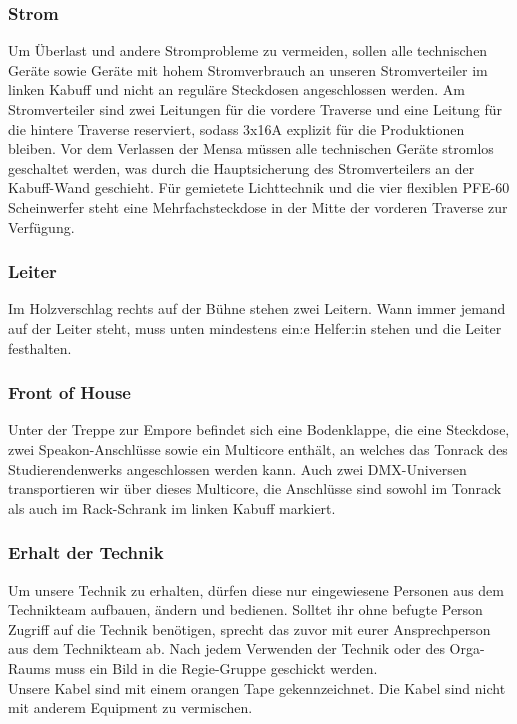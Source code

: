 \subsubsection{Strom}
Um Überlast und andere Stromprobleme zu vermeiden, sollen alle technischen Geräte sowie Geräte mit hohem Stromverbrauch an unseren Stromverteiler im linken Kabuff und nicht an reguläre Steckdosen angeschlossen werden. Am Stromverteiler sind zwei Leitungen für die vordere Traverse und eine Leitung für die hintere Traverse reserviert, sodass 3x16A explizit für die Produktionen bleiben.
Vor dem Verlassen der Mensa müssen alle technischen Geräte stromlos geschaltet werden, was durch die Hauptsicherung des Stromverteilers an der Kabuff-Wand geschieht.
Für gemietete Lichttechnik und die vier flexiblen PFE-60 Scheinwerfer steht eine Mehrfachsteckdose in der Mitte der vorderen Traverse zur Verfügung.

\subsubsection{Leiter}
Im Holzverschlag rechts auf der Bühne stehen zwei Leitern. Wann immer jemand auf der Leiter steht, muss unten mindestens ein:e Helfer:in stehen und die Leiter festhalten.

\subsubsection{Front of House}
Unter der Treppe zur Empore befindet sich eine Bodenklappe, die eine Steckdose, zwei Speakon-Anschlüsse sowie ein Multicore enthält, an welches das Tonrack des Studierendenwerks angeschlossen werden kann. Auch zwei DMX-Universen transportieren wir über dieses Multicore, die Anschlüsse sind sowohl im Tonrack als auch im Rack-Schrank im linken Kabuff markiert.	

\subsubsection{Erhalt der Technik}
Um unsere Technik zu erhalten, dürfen diese nur eingewiesene Personen aus dem Technikteam aufbauen, ändern und bedienen. Solltet ihr ohne befugte Person Zugriff auf die Technik benötigen, sprecht das zuvor mit eurer Ansprechperson aus dem Technikteam ab.	
Nach jedem Verwenden der Technik oder des Orga-Raums muss ein Bild in die Regie-Gruppe geschickt werden.	\\
Unsere Kabel sind mit einem orangen Tape gekennzeichnet. Die Kabel sind nicht mit anderem Equipment zu vermischen.

